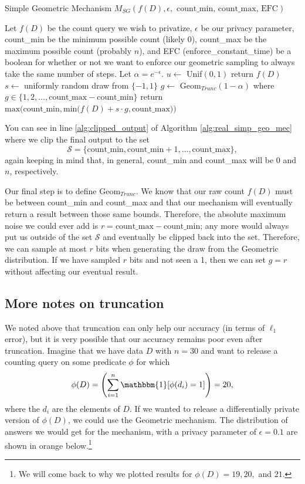 \documentclass[11pt]{scrartcl} %
\begin{document}
\begin{algorithm}[H]
    \caption{Simple Geometric Mechanism $M_{SG}(f(D), \epsilon, \text{ count\_min, count\_max, EFC})$}
    \label{alg:real_simp_geo_mec}
    \begin{algorithmic}[1]
        \State Let $f(D)$ be the count query we wish to privatize, $\epsilon$ be our privacy parameter, count\_min be the minimum
        possible count (likely 0), count\_max be the maximum possible count (probably $n$), and EFC (enforce\_constant\_time) be a boolean
        for whether or not we want to enforce our geometric sampling to always take the same number of steps.
        \State Let $\alpha = e^{-\epsilon}$.
        \State $u \gets$ Unif$(0,1)$
            \State return $f(D)$
        \Else
            \State $s \gets$ uniformly random draw from $\{-1, 1\}$
            \State $g \gets$ $\text{Geom}_{Trunc}(1 - \alpha)$ where $g \in \{1,2,\hdots, \text{count\_max} - \text{count\_min}\}$
            \State return $\text{max}\bigg( \text{count\_min}, \text{min}\big(f(D) + s \cdot g, \text{count\_max}\big) \bigg)$ \label{alg:clipped_output}
        \EndIf
	\end{algorithmic}
\end{algorithm}
You can see in line \ref{alg:clipped_output} of Algorithm \ref{alg:real_simp_geo_mec} where we clip the final output
to the set
\[ \mathcal{S} = \{\text{count\_min}, \text{count\_min} + 1, \hdots, \text{count\_max}\}, \]
again keeping in mind that, in general, count\_min and count\_max will be $0$ and $n$, respectively. \newline

Our final step is to define Geom$_{Trunc}$. We know that our raw count $f(D)$ must be between count\_min and count\_max
and that our mechanism will eventually return a result between those same bounds. Therefore, the absolute maximum noise
we could ever add is $r = \text{count\_max} - \text{count\_min}$; any more would always put us outside of the set $\mathcal{S}$
and eventually be clipped back into the set. Therefore, we can sample at most $r$ bits when generating the draw
from the Geometric distribution. If we have sampled $r$ bits and not seen a 1, then we can set $g = r$ without
affecting our eventual result.

\subsection{More notes on truncation}
We noted above that truncation can only help our accuracy (in terms of $\ell_1$ error), but it is very possible that our accuracy
remains poor even after truncation. Imagine that we have data $D$ with $n=30$ and want to release a counting query on
some predicate $\phi$ for which
\[ \phi(D) = \left( \sum_{i=1}^{n}\mathbbm{1} [\phi(d_i) = 1] \right) = 20, \]
where the $d_i$ are the elements of $D$. If we wanted to release a differentially private version of $\phi(D)$, we
could use the Geometric mechanism. The distribution of answers we would get for the mechanism, with a privacy parameter of $\epsilon = 0.1$
are shown in orange below.\footnote{We will come back to why we plotted results for $\phi(D) = 19, 20,$ and $21$.}
\end{document}
